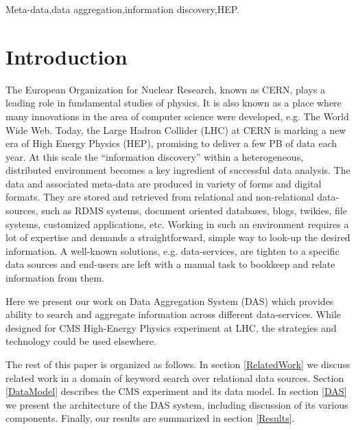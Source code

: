\documentclass[1p,times]{elsarticle}
\begin{document}
\begin{frontmatter}
\begin{keyword}
Meta-data\sep data aggregation\sep information discovery\sep HEP.


\end{keyword}

\end{frontmatter}


\section{Introduction}
The European Organization for Nuclear Research, known as CERN, plays a leading
role in fundamental studies of physics. It is also known as a place where
many innovations in the area of computer science were developed, e.g. The World Wide Web.
Today, the Large Hadron Collider (LHC) at CERN is marking a new era of High Energy
Physics (HEP), promising to deliver a few PB of data each year. 
At this scale the ``information discovery'' within a heterogeneous, distributed 
environment becomes a key ingredient of successful data analysis.
The data and associated meta-data are produced in variety of forms and digital formats.
They are stored and retrieved from relational and non-relational data-sources, such as 
RDMS systems, document oriented databases, blogs, twikies, file systems,
customized applications, etc. Working in such an environment requires a lot 
of expertise and demands a straightforward, simple
way to look-up the desired information.
A well-known solutions, e.g. data-services, are tighten to a specific data 
sources and end-users are left with a manual task to bookkeep and 
relate information from them.

Here we present our work on Data Aggregation System (DAS) which provides
ability to search and aggregate information across different 
data-services. While designed for CMS High-Energy Physics 
experiment at LHC, the strategies and technology could be
used elsewhere. 

The rest of this paper is organized as follows. 
In section \ref{RelatedWork} we discuss related work in a domain of 
keyword search over relational data sources.
Section \ref{DataModel} describes the CMS experiment and its data model. In section
\ref{DAS} we present the architecture of the DAS system, including discussion of its
various components. Finally, our results are summarized in section \ref{Results}.
\end{document}
